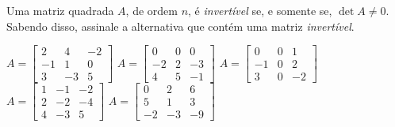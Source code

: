 Uma matriz quadrada $A$, de ordem $n$, é {\it invertível} se, e somente se, $\det A\neq 0$. Sabendo disso, assinale a alternativa que contém uma matriz {\it invertível}.

$A = \left[ \begin{array}{ccc}  2 &  4 & -2\\  -1 &  1 &  0\\  3 & -3 &  5 \end{array} \right]$
$A = \left[ \begin{array}{ccc} 0 & 0 & 0\\ -2 & 2 & -3\\ 4 &5 & -1 \end{array} \right]$
$A = \left[ \begin{array}{ccc} 0& 0 & 1\\ -1& 0 & 2\\ 3 & 0 & -2 \end{array} \right]$
$A = \left[ \begin{array}{ccc} 1 & -1 & -2\\ 2 & -2 & -4\\ 4 &-3 & 5 \end{array} \right]$
$A = \left[ \begin{array}{ccc}  0 &  2 &  6\\  5 &  1 &  3\\ -2 & -3 & -9 \end{array} \right]$








